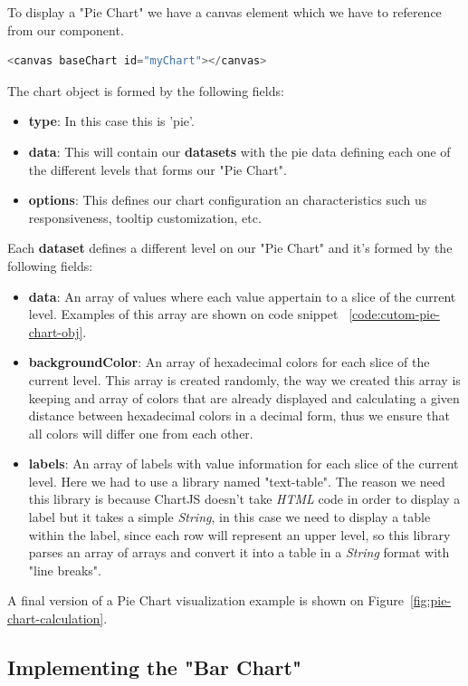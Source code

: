 \documentclass[a4paper, 12pt, english]{book}
\begin{document}
To display a "Pie Chart" we have a canvas element which we have to reference from our component.
\begin{lstlisting}[language=javascript]
<canvas baseChart id="myChart"></canvas>
\end{lstlisting}
The chart object is formed by the following fields:
\begin{itemize}
    \item \textbf{type}: In this case this is 'pie'.
    \item \textbf{data}: This will contain our \textbf{datasets} with the pie data defining each one of the different levels that forms our "Pie Chart".
    \item \textbf{options}: This defines our chart configuration an characteristics such us responsiveness, tooltip customization, etc.
\end{itemize}

Each \textbf{dataset} defines a different level on our "Pie Chart" and it's formed by the following fields:
\begin{itemize}
    \item \textbf{data}: An array of values where each value appertain to a slice of the current level. Examples of this array are shown on code snippet ~\ref{code:cutom-pie-chart-obj}.
    \item \textbf{backgroundColor}: An array of hexadecimal colors for each slice of the current level. This array is created randomly, the way we created this array is keeping and array of colors that are already displayed and calculating a given distance between hexadecimal colors in a decimal form, thus we ensure that all colors will differ one from each other.
    \item \textbf{labels}: An array of labels with value information for each slice of the current level. Here we had to use a library named "text-table". The reason we need this library is because ChartJS doesn't take \textit{HTML} code in order to display a label but it takes a simple \textit{String}, in this case we need to display a table within the label, since each row will represent an upper level, so this library parses an array of arrays and convert it into a table in a \textit{String} format with "line breaks".
\end{itemize}

A final version of a Pie Chart visualization example is shown on Figure~\ref{fig:pie-chart-calculation}.

\subsection{Implementing the "Bar Chart"}
\label{sec:pie-chart}
\end{document}
